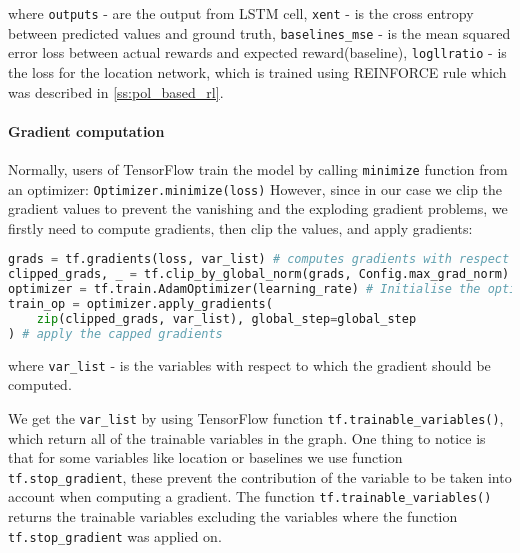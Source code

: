 where \lstinline{outputs} - are the output from \gls{LSTM} cell,
\lstinline{xent} - is the cross entropy between predicted values and ground truth,
\lstinline{baselines_mse} - is the mean squared error loss between actual rewards
and expected reward(baseline),
\lstinline{logllratio} - is the loss for the location network, which is trained
using REINFORCE rule which was described in \autoref{ss:pol_based_rl}.

\paragraph{Gradient computation} Normally, users of TensorFlow train the model
by calling \lstinline{minimize} function from an optimizer: \lstinline{Optimizer.minimize(loss)}
However, since in our case we clip the gradient values
to prevent the vanishing and the exploding gradient problems, we firstly
need to compute gradients, then clip the values, and apply gradients:

\begin{lstlisting}[language=Python, caption={gradient computation},label={list:comp_grad}]
grads = tf.gradients(loss, var_list) # computes gradients with respect to var_list
clipped_grads, _ = tf.clip_by_global_norm(grads, Config.max_grad_norm) # clip the values
optimizer = tf.train.AdamOptimizer(learning_rate) # Initialise the optimizer
train_op = optimizer.apply_gradients(
	zip(clipped_grads, var_list), global_step=global_step
) # apply the capped gradients
\end{lstlisting}
where \lstinline{var_list} - is the variables with respect to which the gradient should
be computed.

We get the \lstinline{var_list} by using TensorFlow function \lstinline{tf.trainable_variables()},
which return all of the trainable variables in the graph. One thing to notice is
that for some variables like location or baselines we use function \lstinline{tf.stop_gradient},
these prevent the contribution of the variable to be taken into account when computing a
gradient. The function \lstinline{tf.trainable_variables()} returns the trainable variables excluding
the variables where the function \lstinline{tf.stop_gradient} was applied on.
